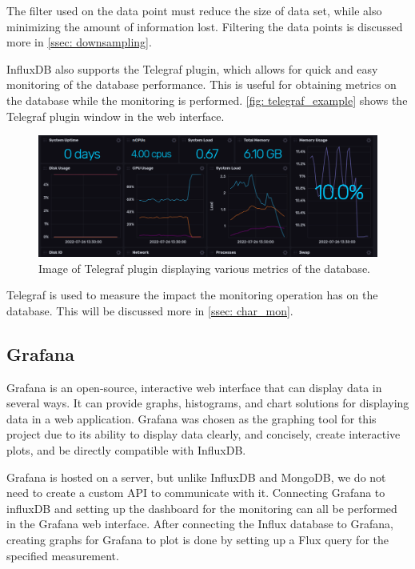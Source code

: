 \documentclass[main.tex]{subfiles}
\begin{document}
The filter used on the data point must reduce the size of data set, while also minimizing the amount of information lost. Filtering the data points is discussed more in \autoref{ssec: downsampling}.

InfluxDB also supports the Telegraf plugin, which allows for quick and easy monitoring of the database performance. This is useful for obtaining metrics on the database while the monitoring is performed. \autoref{fig: telegraf_example} shows the Telegraf plugin window in the web interface.

\begin{figure}[!htpb]
    \centering
    \includegraphics[width=17cm, scale=4]{images/telegraf_example.png}
    \caption{Image of Telegraf plugin displaying various metrics of the database.}
    \label{fig: telegraf_example}
\end{figure}
\FloatBarrier

Telegraf is used to measure the impact the monitoring operation has on the database. This will be discussed more in \autoref{ssec: char_mon}.

\subsection{Grafana}
\label{ssec: grafana}
Grafana is an open-source, interactive web interface that can display data in several ways. It can provide graphs, histograms, and chart solutions for displaying data in a web application. Grafana was chosen as the graphing tool for this project due to its ability to display data clearly, and concisely, create interactive plots, and be directly compatible with InfluxDB.

Grafana is hosted on a server, but unlike InfluxDB and MongoDB, we do not need to create a custom API to communicate with it. Connecting Grafana to influxDB and setting up the dashboard for the monitoring can all be performed in the Grafana web interface. After connecting the Influx database to Grafana, creating graphs for Grafana to plot is done by setting up a Flux query for the specified measurement.
\end{document}
